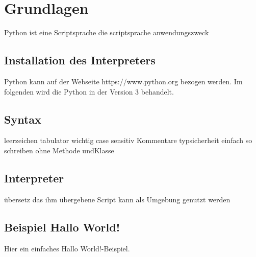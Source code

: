 
\section{Grundlagen}
Python ist eine Scriptsprache die 
scriptsprache
anwendungszweck

\subsection{Installation des Interpreters}
Python kann auf der Webseite https://www.python.org bezogen werden.
Im folgenden wird die Python in der Version 3 behandelt.

\begin{enumerate}

\end{enumerate}

\subsection{Syntax}
leerzeichen
tabulator wichtig
case sensitiv
Kommentare
typsicherheit
einfach so schreiben ohne Methode undKlasse


\subsection{Interpreter}
übersetz das ihm übergebene Script
kann als Umgebung genutzt werden


\subsection{Beispiel \glqq Hallo World!\grqq}
Hier ein einfaches \glqq Hallo World!\grqq -Beispiel.


